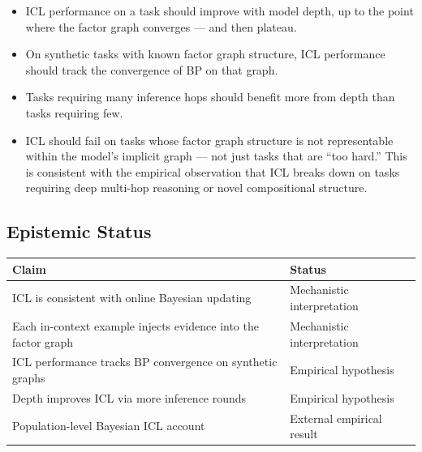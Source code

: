 \begin{itemize}
\item ICL performance on a task should improve with model depth, up to the
point where the factor graph converges --- and then plateau.
\item On synthetic tasks with known factor graph structure, ICL performance
should track the convergence of BP on that graph.
\item Tasks requiring many inference hops should benefit more from depth
than tasks requiring few.
\item ICL should fail on tasks whose factor graph structure is not
representable within the model's implicit graph --- not just tasks that
are ``too hard.'' This is consistent with the empirical observation that
ICL breaks down on tasks requiring deep multi-hop reasoning or novel
compositional structure.
\end{itemize}

\subsection*{Epistemic Status}

\begin{center}
\begin{tabular}{ll}
\toprule
Claim & Status \\
\midrule
ICL is consistent with online Bayesian updating & Mechanistic interpretation \\
Each in-context example injects evidence into the factor graph & Mechanistic interpretation \\
ICL performance tracks BP convergence on synthetic graphs & Empirical hypothesis \\
Depth improves ICL via more inference rounds & Empirical hypothesis \\
Population-level Bayesian ICL account~\cite{xie2022icl} & External empirical result \\
\bottomrule
\end{tabular}
\end{center}